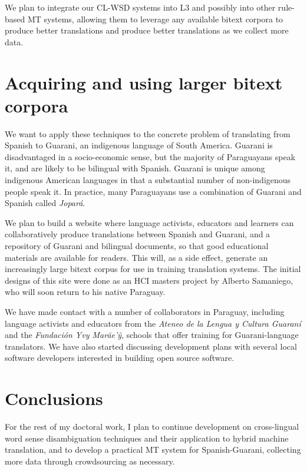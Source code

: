 \documentclass{article}
\begin{document}
We plan to integrate our CL-WSD systems into L3 and possibly into other
rule-based MT systems, allowing them to leverage any available bitext corpora
to produce better translations and produce better translations as we collect
more data.

\section{Acquiring and using larger bitext corpora}
We want to apply these techniques to the concrete problem of translating from
Spanish to Guarani, an indigenous language of South America. Guarani is
disadvantaged in a socio-economic sense, but the majority of Paraguayans speak
it, and are likely to be bilingual with Spanish. Guarani is unique among
indigenous American languages in that a substantial number of non-indigenous
people speak it. In practice, many Paraguayans use a combination of Guarani and
Spanish called \emph{Jopar{\'a}}.

We plan to build a website where language activists, educators and learners can
collaboratively produce translations between Spanish and Guarani, and a
repository of Guarani and bilingual documents, so that good educational
materials are available for readers. This will, as a side effect, generate an
increasingly large bitext corpus for use in training translation systems.  The
initial designs of this site were done as an HCI masters project by Alberto
Samaniego, who will soon return to his native Paraguay.

We have made contact with a number of collaborators in Paraguay, including
language activists and educators from the \emph{Ateneo de la Lengua y Cultura
Guaraní} and the \emph{Fundación Yvy Marãe'{\~y}}, schools that offer training
for Guarani-language translators. We have also started discussing development
plans with several local software developers interested in building open source
software.

\section{Conclusions}
For the rest of my doctoral work, I plan to continue development on
cross-lingual word sense disambiguation techniques and their application to
hybrid machine translation, and to develop a practical MT system for
Spanish-Guarani, collecting more data through crowdsourcing as necessary.
\end{document}
